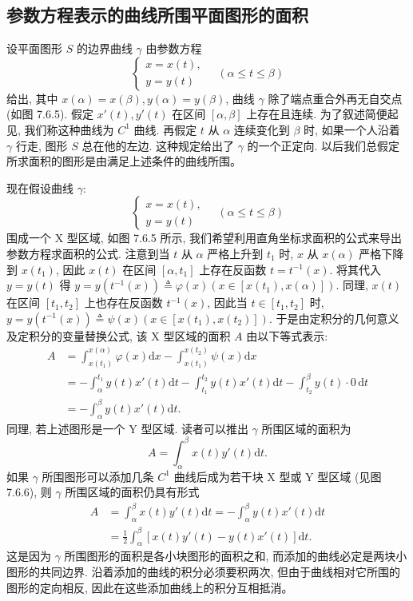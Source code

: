 \documentclass[UTF8, 12pt, fontset=fandol, oneside]{ctexart}
\begin{document}
\subsection{参数方程表示的曲线所围平面图形的面积}

设平面图形 $S$ 的边界曲线 $\gamma$ 由参数方程
\[
  \begin{cases}
    x=x(t),\\
    y=y(t)
  \end{cases}
  \quad(\alpha\leq t\leq\beta)
\]
给出, 其中 $x(\alpha)=x(\beta),y(\alpha)=y(\beta)$, 曲线 $\gamma$ 除了端点重合外再无自交点 (如图 7.6.5). 假定 $x'(t),y'(t)$ 在区间 $[\alpha,\beta]$ 上存在且连续. 为了叙述简便起见, 我们称这种曲线为 $C^1$ 曲线. 再假定 $t$ 从 $\alpha$ 连续变化到 $\beta$ 时, 如果一个人沿着 $\gamma$ 行走, 图形 $S$ 总在他的左边. 这种规定给出了 $\gamma$ 的一个正定向. 以后我们总假定所求面积的图形是由满足上述条件的曲线所围。

现在假设曲线 $\gamma$:
\[
  \begin{cases}
    x=x(t),\\
    y=y(t)
  \end{cases}
  \quad(\alpha\leq t\leq\beta)
\]
围成一个 X 型区域, 如图 7.6.5 所示, 我们希望利用直角坐标求面积的公式来导出参数方程求面积的公式. 注意到当 $t$ 从 $\alpha$ 严格上升到 $t_1$ 时, $x$ 从 $x(\alpha)$ 严格下降到 $x(t_1)$, 因此 $x(t)$ 在区间 $[\alpha,t_1]$ 上存在反函数 $t=t^{-1}(x)$. 将其代入 $y=y(t)$ 得 $y=y(t^{-1}(x))\triangleq\varphi(x)(x\in[x(t_1),x(\alpha)])$. 同理, $x(t)$ 在区间 $[t_1,t_2]$ 上也存在反函数 $t^{-1}(x)$, 因此当 $t\in[t_1,t_2]$ 时, $y=y(t^{-1}(x))\triangleq\psi(x)(x\in[x(t_1),x(t_2)])$. 于是由定积分的几何意义及定积分的变量替换公式, 该 X 型区域的面积 $A$ 由以下等式表示:
\[
\begin{aligned}
  A&=\int_{x(t_1)}^{x(\alpha)}\varphi(x)\mathrm dx
  -\int_{x(t_1)}^{x(t_2)}\psi(x)\mathrm dx\\
  &=-\int_\alpha^{t_1}y(t)x'(t)\mathrm dt
  -\int_{t_1}^{t_2}y(t)x'(t)\mathrm dt
  -\int_{t_2}^{\beta}y(t)\cdot0\,\mathrm dt\\
  &=-\int_\alpha^\beta y(t)x'(t)\mathrm dt.
\end{aligned}
\]
同理, 若上述图形是一个 Y 型区域. 读者可以推出 $\gamma$ 所围区域的面积为
\[
  A=\int_\alpha^\beta x(t)y'(t)\mathrm dt.
\]
如果 $\gamma$ 所围图形可以添加几条 $C^1$ 曲线后成为若干块 X 型或 Y 型区域 (见图 7.6.6), 则 $\gamma$ 所围区域的面积仍具有形式
\begin{equation}
\begin{aligned}
  A&=\int_\alpha^\beta x(t)y'(t)\mathrm dt
  =-\int_\alpha^\beta y(t)x'(t)\mathrm dt\\
  &=\frac{1}{2}\int_\alpha^\beta [x(t)y'(t)-y(t)x'(t)]\mathrm dt.
\end{aligned}
\tag{7.6.4}
\end{equation}
这是因为 $\gamma$ 所围图形的面积是各小块图形的面积之和, 而添加的曲线必定是两块小图形的共同边界. 沿着添加的曲线的积分必须要积两次, 但由于曲线相对它所围的图形的定向相反, 因此在这些添加曲线上的积分互相抵消。
\end{document}

